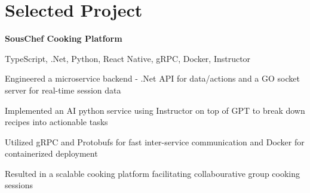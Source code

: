 
\newenvironment{twocolentry_proj}[2][]{
    \onecolentry
    \def\secondColumn{#2}
    \setcolumnwidth{\fill, 7 cm}
    \begin{paracol}{2}
}{
    \switchcolumn \raggedleft \secondColumn
    \end{paracol}
    \endonecolentry
} %

\vspace{5 pt - 0.4 cm}
\section{Selected Project}
\begin{twocolentry_proj}{
    \mbox{}%
}

\textbf{SousChef Cooking Platform}
\end{twocolentry_proj}

\vspace{0.10 cm}
\begin{onecolentry}
    \small TypeScript, .Net, Python, React Native, gRPC, Docker, Instructor 
    \begin{highlights}
        \item Engineered a microservice backend - .Net API for data/actions and a GO socket server for real-time session data
        \item Implemented an AI python service using Instructor on top of GPT to break down recipes into actionable tasks
        \item Utilized gRPC and Protobufs for fast inter-service communication and Docker for containerized deployment
        \item Resulted in a scalable cooking platform facilitating collabourative group cooking sessions
    \end{highlights}
\end{onecolentry}
